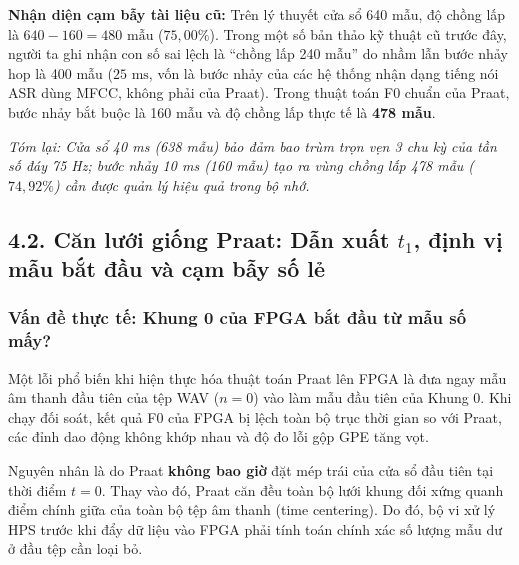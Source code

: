 \begin{feynmanbox}
\textbf{Nhận diện cạm bẫy tài liệu cũ:} Trên lý thuyết cửa sổ 640 mẫu, độ chồng lấp là $640 - 160 = 480\text{ mẫu}$ ($75{,}00\%$). Trong một số bản thảo kỹ thuật cũ trước đây, người ta ghi nhận con số sai lệch là ``chồng lấp 240 mẫu'' do nhầm lẫn bước nhảy hop là 400 mẫu ($25\text{ ms}$, vốn là bước nhảy của các hệ thống nhận dạng tiếng nói ASR dùng MFCC, không phải của Praat). Trong thuật toán F0 chuẩn của Praat, bước nhảy bắt buộc là 160 mẫu và độ chồng lấp thực tế là \textbf{478 mẫu}.
\end{feynmanbox}

\textit{Tóm lại: Cửa sổ 40 ms (638 mẫu) bảo đảm bao trùm trọn vẹn 3 chu kỳ của tần số đáy 75 Hz; bước nhảy 10 ms (160 mẫu) tạo ra vùng chồng lấp 478 mẫu ($74{,}92\%$) cần được quản lý hiệu quả trong bộ nhớ.}

\subsection*{4.2. Căn lưới giống Praat: Dẫn xuất \texorpdfstring{$t_1$}{t1}, định vị mẫu bắt đầu và cạm bẫy số lẻ}

\subsubsection*{Vấn đề thực tế: Khung 0 của FPGA bắt đầu từ mẫu số mấy?}
Một lỗi phổ biến khi hiện thực hóa thuật toán Praat lên FPGA là đưa ngay mẫu âm thanh đầu tiên của tệp WAV ($n = 0$) vào làm mẫu đầu tiên của Khung 0. Khi chạy đối soát, kết quả F0 của FPGA bị lệch toàn bộ trục thời gian so với Praat, các đỉnh dao động không khớp nhau và độ đo lỗi gộp GPE tăng vọt.

Nguyên nhân là do Praat \textbf{không bao giờ} đặt mép trái của cửa sổ đầu tiên tại thời điểm $t = 0$. Thay vào đó, Praat căn đều toàn bộ lưới khung đối xứng quanh điểm chính giữa của toàn bộ tệp âm thanh (time centering). Do đó, bộ vi xử lý HPS trước khi đẩy dữ liệu vào FPGA phải tính toán chính xác số lượng mẫu dư ở đầu tệp cần loại bỏ.

